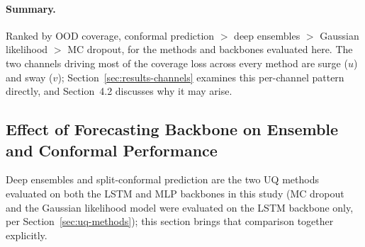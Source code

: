 \documentclass[a4paper,fleqn]{cas-sc}
\begin{document}
\paragraph{Summary.} Ranked by OOD coverage, conformal prediction $>$ deep ensembles $>$ Gaussian likelihood $>$ MC dropout, for the methods and backbones evaluated here. The two channels driving most of the coverage loss across every method are surge ($u$) and sway ($v$); Section~\ref{sec:results-channels} examines this per-channel pattern directly, and Section~4.2 discusses why it may arise.

\subsection{Effect of Forecasting Backbone on Ensemble and Conformal Performance}
\label{sec:results-backbone}

Deep ensembles and split-conformal prediction are the two UQ methods evaluated on both the LSTM and MLP backbones in this study (MC dropout and the Gaussian likelihood model were evaluated on the LSTM backbone only, per Section~\ref{sec:uq-methods}); this section brings that comparison together explicitly.
\end{document}
